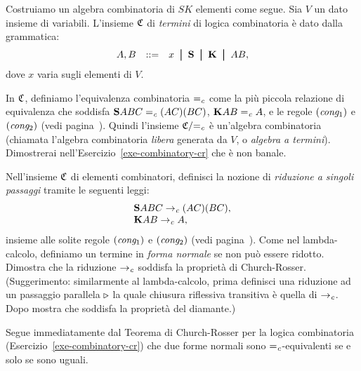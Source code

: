 \documentclass{article}
\begin{document}
\begin{example}\label{exa-sk-term-alg}
  Costruiamo un algebra combinatoria di $SK$ elementi come segue.  Sia
  $V$ un dato insieme di variabili. L'insieme ${\mathfrak C}$ di {\em termini}
  di logica combinatoria \`e dato dalla grammatica:
  \[   \begin{array}{lll}
    A,B &\bnf& x\bor \S\bor \K\bor AB,
  \end{array}
  \]
  dove $x$ varia sugli elementi di $V$.
  
  In ${\mathfrak C}$, definiamo l'equivalenza combinatoria $=_{\it c}$ come la
  pi\`u piccola relazione di equivalenza che soddisfa ${\bf S} ABC =_{\it c} (AC)(BC)$, ${\bf K}
  AB =_{\it c} A$, e le regole $\textrm{(\textit{cong$_1$\/})}$ e $\textrm{(\textit{cong$_2$\/})}$
  (vedi pagina~\pageref{page-def-beta}). Quindi l'insieme ${\mathfrak C}/{=_{\it c}}$ \`e
  un'algebra combinatoria (chiamata l'algebra combinatoria {\em libera}
  generata da $V$, o {\em algebra a termini}). Dimostrerai
  nell'Esercizio~\ref{exe-combinatory-cr} che \`e non banale.
\end{example}


\begin{exercise}\label{exe-combinatory-cr}
  Nell'insieme ${\mathfrak C}$ di elementi combinatori, definisci la nozione di {\em
    riduzione a singoli passaggi} tramite le seguenti leggi:
  \[ \begin{array}{l}
    {\bf S} ABC \rightarrow_{\it c} (AC)(BC), \\
    {\bf K} AB \rightarrow_{\it c} A,\\
  \end{array}
  \]
  insieme alle solite regole $\textrm{(\textit{cong$_1$\/})}$ e
  $\textrm{(\textit{cong$_2$\/})}$ (vedi pagina~\pageref{page-def-beta}). Come nel
  lambda-calcolo, definiamo un termine in {\em forma normale} se non pu\`o essere
  ridotto. Dimostra che la riduzione $\rightarrow_{\it c}$ soddisfa la propriet\`a
  di Church-Rosser. (Suggerimento: similarmente al lambda-calcolo,
  prima definisci una riduzione ad un passaggio parallela $\mathrel{\triangleright}$ la
  quale chiusura riflessiva transitiva \`e quella di $\rightarrow_{\it c}$. Dopo mostra
  che soddisfa la propriet\`a del diamante.)
\end{exercise}

\begin{corollary}\label{cor-sk-nf}
  Segue immediatamente dal Teorema di Church-Rosser per la
  logica combinatoria (Esercizio~\ref{exe-combinatory-cr}) che due
  forme normali sono $=_{\it c}$-equivalenti se e solo se sono uguali.
\end{corollary}
\end{document}
